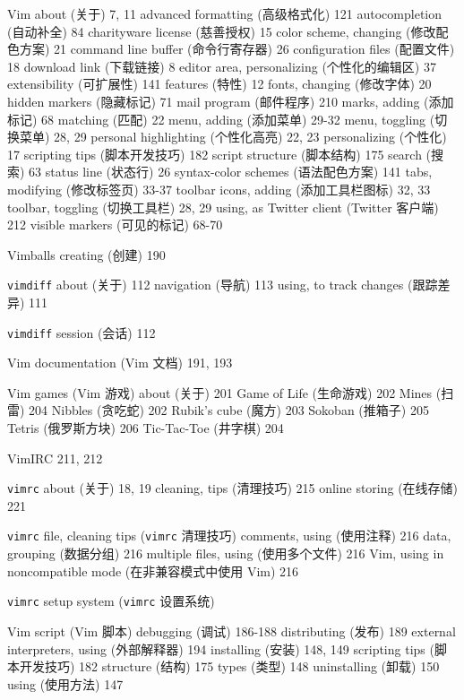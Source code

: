 Vim
  about (关于) 7, 11
  advanced formatting (高级格式化) 121
  autocompletion (自动补全) 84
  charityware license (慈善授权) 15
  color scheme, changing (修改配色方案) 21
  command line buffer (命令行寄存器) 26
  configuration files (配置文件) 18
  download link (下载链接) 8
  editor area, personalizing (个性化的编辑区) 37
  extensibility (可扩展性) 141
  features (特性) 12
  fonts, changing (修改字体) 20
  hidden markers (隐藏标记) 71
  mail program (邮件程序) 210
  marks, adding (添加标记) 68
  matching (匹配) 22
  menu, adding (添加菜单) 29-32
  menu, toggling (切换菜单) 28, 29
  personal highlighting (个性化高亮) 22, 23
  personalizing (个性化) 17
  scripting tips (脚本开发技巧) 182
  script structure (脚本结构) 175
  search (搜索) 63
  status line (状态行) 26
  syntax-color schemes (语法配色方案) 141
  tabs, modifying (修改标签页) 33-37
  toolbar icons, adding (添加工具栏图标) 32, 33
  toolbar, toggling (切换工具栏) 28, 29
  using, as Twitter client (Twitter 客户端) 212
  visible markers (可见的标记) 68-70

Vimballs
  creating (创建) 190

\texttt{vimdiff}
  about (关于) 112
  navigation (导航) 113
  using, to track changes (跟踪差异) 111

\texttt{vimdiff} session (会话) 112

Vim documentation (Vim 文档) 191, 193

Vim games (Vim 游戏)
  about (关于) 201
  Game of Life (生命游戏) 202
  Mines (扫雷) 204
  Nibbles (贪吃蛇) 202
  Rubik's cube (魔方) 203
  Sokoban (推箱子) 205
  Tetris (俄罗斯方块) 206
  Tic-Tac-Toe (井字棋) 204

VimIRC 211, 212

\texttt{vimrc}
  about (关于) 18, 19
  cleaning, tips (清理技巧) 215
  online storing (在线存储) 221

\texttt{vimrc} file, cleaning tips (\texttt{vimrc} 清理技巧)
  comments, using (使用注释) 216
  data, grouping (数据分组) 216
  multiple files, using (使用多个文件) 216
  Vim, using in noncompatible mode (在非兼容模式中使用 Vim) 216

\texttt{vimrc} setup system (\texttt{vimrc} 设置系统)

Vim script (Vim 脚本)
  debugging (调试) 186-188
  distributing (发布) 189
  external interpreters, using (外部解释器) 194
  installing (安装) 148, 149
  scripting tips (脚本开发技巧) 182
  structure (结构) 175
  types (类型) 148
  uninstalling (卸载) 150
  using (使用方法) 147

